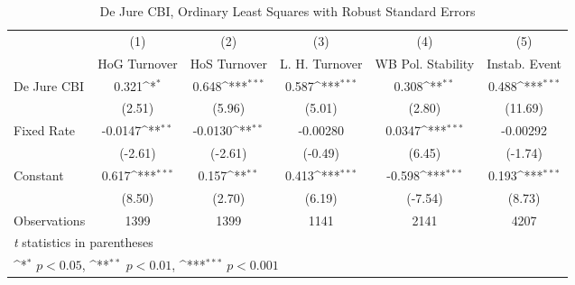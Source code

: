 {
\def\sym#1{\ifmmode^{#1}\else\(^{#1}\)\fi}
\begin{longtable}{l*{5}{c}}
\caption{De Jure CBI, Ordinary Least Squares with Robust Standard Errors \label{multIndOLSDJ}}\\
\hline\hline\endfirsthead\hline\endhead\hline\endfoot\endlastfoot
                &\multicolumn{1}{c}{(1)}&\multicolumn{1}{c}{(2)}&\multicolumn{1}{c}{(3)}&\multicolumn{1}{c}{(4)}&\multicolumn{1}{c}{(5)}\\
                &\multicolumn{1}{c}{HoG Turnover}&\multicolumn{1}{c}{HoS Turnover}&\multicolumn{1}{c}{L. H. Turnover}&\multicolumn{1}{c}{WB Pol. Stability}&\multicolumn{1}{c}{Instab. Event}\\
\hline
De Jure CBI     &    0.321\sym{*}  &    0.648\sym{***}&    0.587\sym{***}&    0.308\sym{**} &    0.488\sym{***}\\
                &   (2.51)         &   (5.96)         &   (5.01)         &   (2.80)         &  (11.69)         \\
[1em]
Fixed Rate      &  -0.0147\sym{**} &  -0.0130\sym{**} & -0.00280         &   0.0347\sym{***}& -0.00292         \\
                &  (-2.61)         &  (-2.61)         &  (-0.49)         &   (6.45)         &  (-1.74)         \\
[1em]
Constant        &    0.617\sym{***}&    0.157\sym{**} &    0.413\sym{***}&   -0.598\sym{***}&    0.193\sym{***}\\
                &   (8.50)         &   (2.70)         &   (6.19)         &  (-7.54)         &   (8.73)         \\
\hline
Observations    &     1399         &     1399         &     1141         &     2141         &     4207         \\
\hline\hline
\multicolumn{6}{l}{\footnotesize \textit{t} statistics in parentheses}\\
\multicolumn{6}{l}{\footnotesize \sym{*} \(p<0.05\), \sym{**} \(p<0.01\), \sym{***} \(p<0.001\)}\\
\end{longtable}
}
